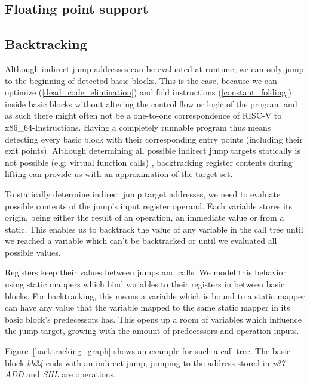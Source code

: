 \documentclass[course=eragp]{aspdoc}
\begin{document}
\subsection{Floating point support}
\subsection{Backtracking}\label{backtracking}
Although indirect jump addresses can be evaluated at runtime, we can only jump to the beginning of
detected basic blocks. This is the case, because we can optimize (\ref{dead_code_elimination}) and fold
instructions (\ref{constant_folding}) inside basic blocks without altering the control flow or
logic of the program and as such there might often not be a one-to-one correspondence of RISC-V to x86\_64-Instructions.
Having a completely runnable program thus means detecting every basic block
with their corresponding entry points (including their exit points). Although determining all possible
indirect jump targets statically is not possible (e.g. virtual function calls)
, backtracking register contents during lifting can provide us with
an approximation of the target set.

\par

To statically determine indirect jump target addresses, we need to evaluate possible contents of
the jump's input register operand. Each variable stores its origin, being either the result of an
operation, an immediate value or from a static. This enables us to backtrack the value of
any variable in the call tree until we reached a variable which can't be backtracked or until we evaluated
all possible values.

\par

Registers keep their values between jumps and calls. We model this behavior using static mappers
which bind variables to their registers in between basic blocks. For backtracking, this means a
variable which is bound to a static mapper can have any value that the variable mapped to the same
static mapper in its basic block's predecessors has. This opens up a room of variables which
influence the jump target, growing with the amount of predecessors and operation inputs.

\par

Figure~\ref{backtracking_graph} shows an example for such a call tree. The basic block \emph{bb24} ends
with an indirect jump, jumping to the address stored in \emph{v37}. \emph{ADD} and \emph{SHL} are operations.
\end{document}
